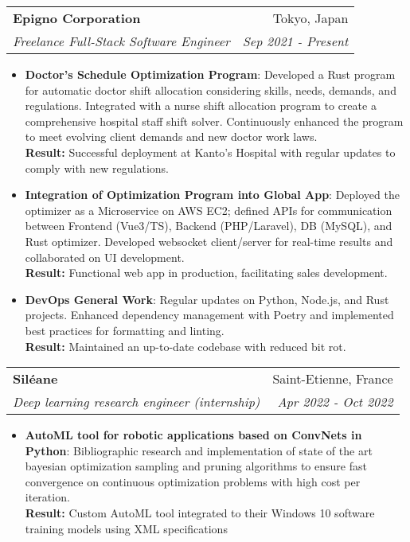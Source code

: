 \documentclass[letterpaper,11pt]{article}
\makeatletter
\newcommand{\resumeItem}[2]{
  \item\small{
    \textbf{#1}{: #2 \vspace{-2pt}}
  }
}
\newcommand{\resumeSubheading}[4]{
  \vspace{-1pt}\item
    \begin{tabular*}{0.97\textwidth}[t]{l@{\extracolsep{\fill}}r}
      \textbf{#1} & #2 \\
      \textit{\small#3} & \textit{\small #4} \\
    \end{tabular*}\vspace{-5pt}
}
\newcommand{\resumeSubSubheading}[2]{
    \begin{tabular*}{0.97\textwidth}{l@{\extracolsep{\fill}}r}
      \textit{\small#1} & \textit{\small #2} \\
    \end{tabular*}\vspace{-5pt}
}
\newcommand{\resumeSubHeadingListEnd}{\end{itemize}}
\newcommand{\resumeItemListStart}{\begin{itemize}}
\newcommand{\resumeItemListEnd}{\end{itemize}\vspace{-5pt}}
\makeatother
\begin{document}

\resumeSubheading
    {Epigno Corporation}{Tokyo, Japan}
    {Freelance Full-Stack Software Engineer}{Sep 2021 - Present}
    \resumeItemListStart
        \resumeItem{Doctor's Schedule Optimization Program}
            {Developed a Rust program for automatic doctor shift allocation considering skills, needs, demands, and regulations. Integrated with a nurse shift allocation program to create a comprehensive hospital staff shift solver. Continuously enhanced the program to meet evolving client demands and new doctor work laws.
            \\\textbf{Result:} Successful deployment at Kanto's Hospital with regular updates to comply with new regulations.}
        \resumeItem{Integration of Optimization Program into Global App}
            {Deployed the optimizer as a Microservice on AWS EC2; defined APIs for communication between Frontend (Vue3/TS), Backend (PHP/Laravel), DB (MySQL), and Rust optimizer. Developed websocket client/server for real-time results and collaborated on UI development.
            \\\textbf{Result:} Functional web app in production, facilitating sales development.}
        \resumeItem{DevOps General Work}
            {Regular updates on Python, Node.js, and Rust projects. Enhanced dependency management with Poetry and implemented best practices for formatting and linting.
            \\\textbf{Result:} Maintained an up-to-date codebase with reduced bit rot.}
    \resumeItemListEnd

    \resumeSubheading
      {Siléane}{Saint-Etienne, France}
      {Deep learning research engineer (internship)}{Apr 2022 - Oct 2022}
      \resumeItemListStart
        \resumeItem{AutoML tool for robotic applications based on ConvNets in Python}
          {Bibliographic research and implementation of state of the art bayesian optimization sampling and pruning algorithms to ensure fast convergence on continuous optimization problems with high cost per iteration.
         \\\textbf{Result:} Custom AutoML tool integrated to their Windows 10 software training models using XML specifications}
      \resumeItemListEnd
\end{document}
